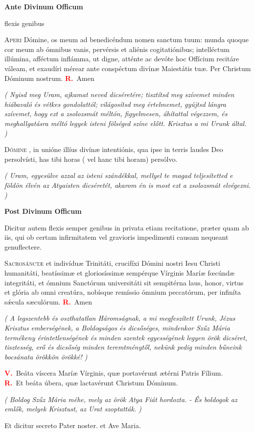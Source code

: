 \documentclass[10pt,a6paper]{article}
\newcommand{\titulus}[1]{%
  \par
  \vspace{1em}
  \begin{center}
    \Large\bfseries #1
  \end{center}
  \vspace{0.8em}
}
\newcommand{\rubrica}[1]{%
  \par
  {\color{red}\footnotesize #1\par}
  \smallskip
}
\newcommand{\V}{\textcolor{red}{\textbf{\litfont V.}}\ }
\newcommand{\R}{\textcolor{red}{\textbf{\litfont R.}}\ }
\newcommand{\forditas}[1]{%
  {\small\itshape (#1)}%
}
\newcommand{\initial}[2]{%
  \lettrine[
    lines=2,
    lhang=.1,
    findent=2pt,
    nindent=0pt
  ]{\color{red}\normalfont #1}{\normalfont #2}
}
\begin{document}
  \titulus{Ante Divinum Officum}
  
  \rubrica{
    flexis genibus
  }

  \initial{A}{peri} Dómine, os meum ad benedicéndum nomen sanctum tuum: 
  munda quoque cor meum ab ómnibus vanis, pervérsis et aliénis cogitatiónibus; 
  intelléctum illúmina, afféctum inflámma, ut digne, atténte ac devóte hoc Offícium recitáre váleam, 
  et exaudíri mérear ante conspéctum divínæ Maiestátis tuæ. Per Christum Dóminum nostrum. \R Amen
  \smallskip

  \forditas{
    Nyisd meg Uram, ajkamat neved dicséretére; tisztítsd meg szívemet minden hiábavaló 
    és vétkes gondolattól; világosítsd meg értelmemet, gyújtsd lángra szívemet, 
    hogy ezt a zsolozsmát méltón, figyelmesen, áhítattal végezzem, 
    és meghallgatásra méltó legyek isteni fölséged színe előtt. Krisztus a mi Urunk által.
  }
  \smallskip

  \initial{D}{ómine}, in unióne illíus divínæ intentiónis, qua ipse in terris laudes Deo persolvísti, 
  has tibi horas ({\color{red} \footnotesize vel} hanc tibi horam) persólvo.
  \smallskip

  \forditas{
    Uram, egyesülve azzal az isteni szándékkal, mellyel te magad teljesítetted 
    e földön élvén az Atyaisten dicséretét, akarom én is most ezt a zsolozsmát elvégezni.
  }

  \newpage
  
  \titulus{Post Divinum Officum}
  
  \rubrica{
    Dicitur autem flexis semper genibus in privata etiam recitatione, 
    præter quam ab iis, qui ob certam infirmitatem vel gravioris impedimenti causam nequeant genuflectere.
  }

  \initial{S}{acrosánctæ} et indivíduæ Trinitáti, crucifíxi Dómini nostri Iesu Christi humanitáti, 
  beatíssimæ et gloriosíssimæ sempérque Vírginis Maríæ fœcúndæ integritáti, 
  et ómnium Sanctórum universitáti sit sempitérna laus, honor, virtus et glória ab omni creatúra, 
  nobísque remíssio ómnium peccatórum, per infiníta sǽcula sæculórum. \R Amen
  \smallskip

  \forditas{
    A legszentebb és oszthatatlan Háromságnak, a mi megfeszített Urunk, Jézus Krisztus emberségének, 
    a Boldogságos és dicsőséges, mindenkor Szűz Mária termékeny érintetlenségének 
    és minden szentek egyességének legyen örök dicséret, tisztesség, erő és dicsőség minden 
    teremtménytől, nekünk pedig minden bűneink bocsánata örökkön örökké!
  }
  \smallskip

  \V Beáta víscera Maríæ Vírginis, quæ portavérunt ætérni Patris Fílium. \\
  \R Et beáta úbera, quæ lactavérunt Christum Dóminum. \\
  \smallskip

  \forditas{
    Boldog Szűz Mária méhe, mely az örök Atya Fiát hordozta. - 
    És boldogok az emlők, melyek Krisztust, az Urat szoptatták.
  }
  
  {\color{red} \footnotesize Et dicitur secreto} Pater noster. {\color{red} \footnotesize et} Ave Maria.
\end{document}
